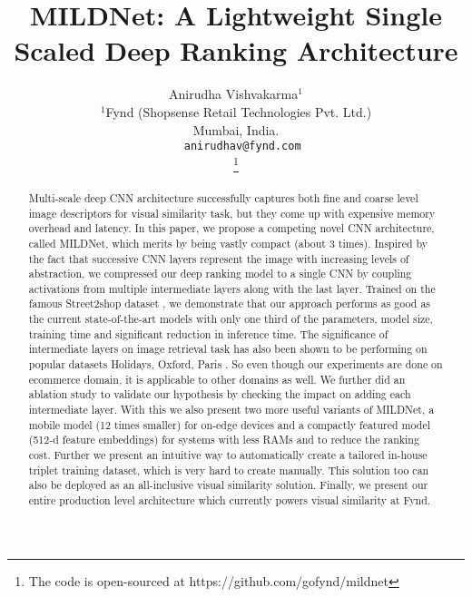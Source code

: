 \documentclass[10pt,twocolumn,letterpaper]{article}
\newcommand\blfootnote[1]{\begingroup
  \renewcommand\thefootnote{}\footnote{#1}\addtocounter{footnote}{-1}\endgroup
}
\begin{document}
\title{\LARGE \bf
MILDNet: A Lightweight Single Scaled Deep Ranking Architecture}

\author{Anirudha Vishvakarma$^{1}$\\
	$^{1}$Fynd (Shopsense Retail Technologies Pvt. Ltd.)\\ Mumbai, India.\\
	{\tt\small ~~anirudhav@fynd.com}\\  \vspace{-1mm}
	\blfootnote{The code is open-sourced at https://github.com/gofynd/mildnet}
}

\maketitle




\begin{abstract}\vspace{-3mm}
Multi-scale deep CNN architecture \cite{c1, c2, c3} successfully captures both fine and coarse level image descriptors for visual similarity task, but they come up with expensive memory overhead and latency. In this paper, we propose a competing novel CNN architecture, called MILDNet, which merits by being vastly compact (about 3 times). Inspired by the fact that successive CNN layers represent the image with increasing levels of abstraction, we compressed our deep ranking model to a single CNN by coupling activations from multiple intermediate layers along with the last layer. Trained on the famous Street2shop dataset \cite{c4}, we demonstrate that our approach performs as good as the current state-of-the-art models with only one third of the parameters, model size, training time and significant reduction in inference time. The significance of intermediate layers on image retrieval task has also been shown to be performing on popular datasets Holidays, Oxford, Paris \cite{c5}. So even though our experiments are done on ecommerce domain, it is applicable to other domains as well. We further did an ablation study to validate our hypothesis by checking the impact on adding each intermediate layer. With this we also present two more useful variants of MILDNet, a mobile model (12 times smaller) for on-edge devices and a compactly featured model (512-d feature embeddings) for systems with less RAMs and to reduce the ranking cost.
Further we present an intuitive way to automatically create a tailored in-house triplet training dataset, which is very hard to create manually. This solution too can also be deployed as an all-inclusive visual similarity solution. Finally, we present our entire production level architecture which currently powers visual similarity at Fynd.
\end{abstract}
\end{document}
